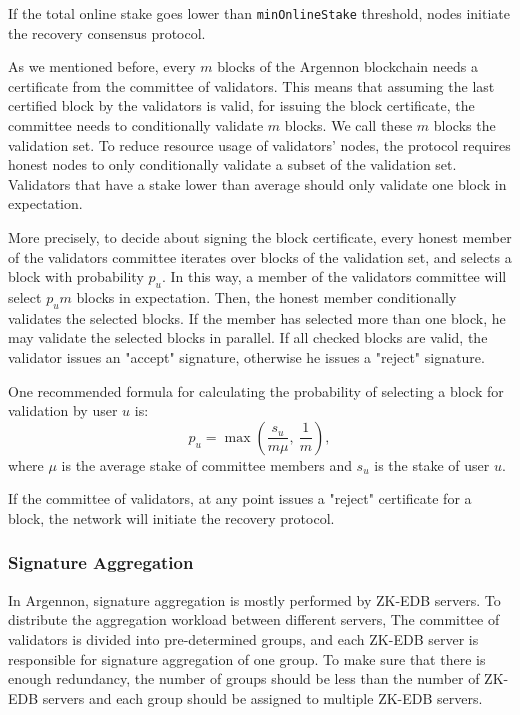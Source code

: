 If the total online stake goes lower than \texttt{minOnlineStake} threshold, nodes initiate the recovery
consensus protocol.

As we mentioned before, every $m$ blocks of the Argennon blockchain needs a certificate from the committee
of validators. This means that assuming the last certified block by the validators is valid, for issuing the block
certificate, the committee needs to conditionally validate $m$ blocks. We call these $m$ blocks the
validation set. To reduce resource usage of validators' nodes, the protocol requires honest nodes to only
conditionally validate a subset of the validation set. Validators that have a stake lower than
average should only validate one block in expectation.

More precisely, to decide about signing the block certificate, every honest member of the validators
committee iterates over blocks of the validation set, and selects a block with
probability $p_u$. In this way, a member of the validators committee will select $p_{u}m$ blocks in expectation.
Then, the honest member conditionally validates the selected blocks. If the member has selected more than one block,
he may validate the selected blocks in parallel.
If all checked blocks are valid, the validator issues an "accept"
signature, otherwise he issues a "reject" signature.

One recommended formula for calculating the probability of selecting a block for validation by user $u$ is:
\begin{equation}
    p_u=\max\left(\frac{s_u}{m\mu},\ \frac{1}{m}\right),\label{eq:block-selection}
\end{equation}
where $\mu$ is the average stake of committee members and $s_u$ is the stake of user $u$.

If the committee of validators, at any point issues a "reject" certificate for a block, the network will initiate the
recovery protocol.

\subsubsection{Signature Aggregation}

In Argennon, signature aggregation is mostly performed by ZK-EDB servers. To distribute the aggregation workload
between different servers, The committee of validators is divided into pre-determined groups, and each ZK-EDB
server is responsible for signature aggregation of one group. To make sure that there is enough redundancy, the number
of groups should be less than the number of ZK-EDB servers and each group should be assigned to
multiple ZK-EDB servers.

